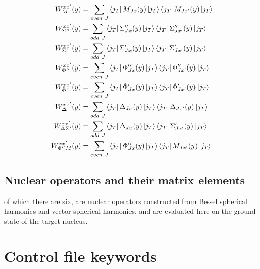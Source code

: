 \documentclass[12pt]{article}
\begin{document}
 
\begin{align}
W_M^{xx'}(y) &= \sum_{even\ J} 
\bra{j_T}M_{Jx}(y)\ket{j_T}
\bra{j_T}M_{Jx'}(y)\ket{j_T}
\\
W_{\Sigma''}^{xx'}(y) &= \sum_{odd\ J} 
\bra{j_T}{\Sigma''}_{Jx}(y)\ket{j_T}
\bra{j_T}{\Sigma''}_{Jx'}(y)\ket{j_T}
\\
W_{\Sigma'}^{xx'}(y) &= \sum_{odd\ J} 
\bra{j_T}{\Sigma'}_{Jx}(y)\ket{j_T}
\bra{j_T}{\Sigma'}_{Jx'}(y)\ket{j_T}
\\
W_{\Phi''}^{xx'}(y) &= \sum_{even\ J} 
\bra{j_T}{\Phi''}_{Jx}(y)\ket{j_T}
\bra{j_T}{\Phi''}_{Jx'}(y)\ket{j_T}
\\
W_{\tilde{\Phi}'}^{xx'}(y) &= \sum_{even\ J} 
\bra{j_T}{\tilde{\Phi}'}_{Jx}(y)\ket{j_T}
\bra{j_T}{\tilde{\Phi}'}_{Jx'}(y)\ket{j_T}
\\
W_{\Delta}^{xx'}(y) &= \sum_{odd\ J} 
\bra{j_T}{\Delta}_{Jx}(y)\ket{j_T}
\bra{j_T}{\Delta}_{Jx'}(y)\ket{j_T}
\\
W_{\Delta\Sigma'}^{xx'}(y) &= \sum_{odd\ J} 
\bra{j_T}{\Delta}_{Jx}(y)\ket{j_T}
\bra{j_T}{\Sigma'}_{Jx'}(y)\ket{j_T}
\\
W_{\Phi''M}^{xx'}(y) &= \sum_{even\ J} 
\bra{j_T}{\Phi''}_{Jx}(y)\ket{j_T}
\bra{j_T}{M}_{Jx'}(y)\ket{j_T}
\end{align}


\subsection{Nuclear operators and their matrix elements}
of which there are six, are nuclear operators constructed from Bessel 
spherical harmonics and vector spherical harmonics, and are evaluated here on 
the ground state of the target nucleus.

\section{Control file keywords}
\end{document}
